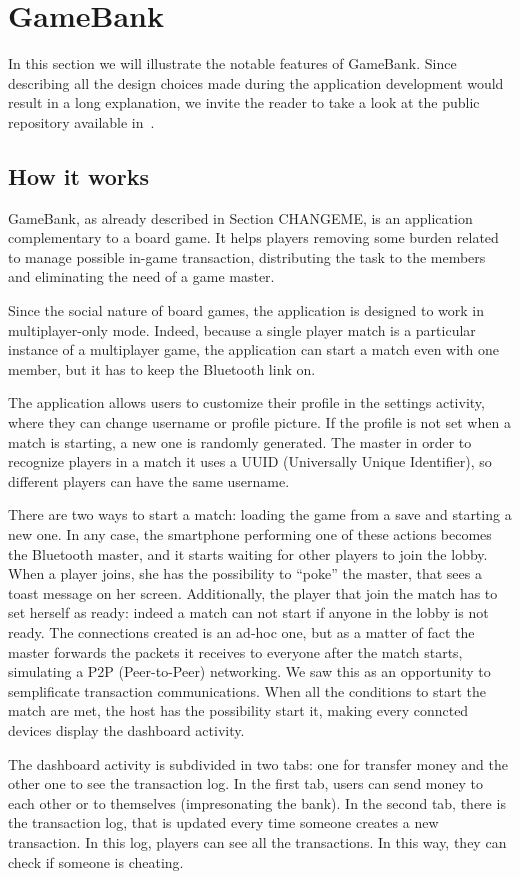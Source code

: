 \section{GameBank}

In this section we will illustrate the notable features of GameBank. Since 
describing all the design choices made during the application development would 
result in a long explanation, we invite the reader to take a look at the public 
repository available in~\cite{gamebank18}.

\subsection{How it works}

GameBank, as already described in Section CHANGEME,  is an application complementary to a board game. It helps players 
removing some burden related to manage possible in-game transaction, 
distributing the task to the members and eliminating the need of a game master.

Since the social nature of board games, the application is designed to work 
in multiplayer-only mode. Indeed, because a single player match is a particular 
instance of a multiplayer game, the application can start a match even with one 
member, but it has to keep the Bluetooth link on.

The application allows users to customize their profile in the settings 
activity, where they can change username or profile picture. If the profile is 
not set when a match is starting, a new one is randomly generated. The master 
in order to recognize players in a match it uses a UUID (Universally Unique 
Identifier), so different players can have the same username.

There are two ways to start a match: loading the game from a save and starting 
a new one. In any case, the smartphone performing one of these actions becomes 
the Bluetooth master, and it starts waiting for other players to join the 
lobby. When a player joins, she has the possibility to ``poke'' the master, 
that sees a toast message on her screen. Additionally, the player that join the 
match has to set herself as ready: indeed a match can not start if anyone in the 
lobby is not ready. 
The connections created is an ad-hoc one, but as a matter of fact the master 
forwards the packets it receives to everyone after the match starts, simulating 
a P2P (Peer-to-Peer) networking. We saw this as an opportunity to semplificate 
transaction communications.
When all the conditions to start the match are met, the host has the 
possibility start it, making every conncted devices display the dashboard 
activity.

The dashboard activity is subdivided in two tabs: one for transfer money and 
the other one to see the transaction log. In the first tab, users can send 
money to each other or to themselves (impresonating the bank). In the second 
tab, there is the transaction log, that is updated every time someone creates a 
new transaction. In this log, players can see all the transactions. In this 
way, they can check if someone is cheating. 
